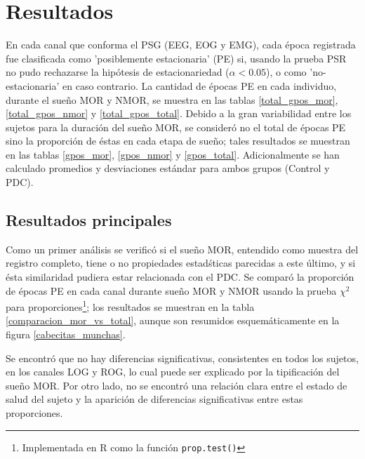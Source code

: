 \documentclass[12pt,a4paper]{mitthesis}
\begin{document}

\chapter{Resultados}

En cada canal que conforma el PSG (EEG, EOG y EMG), cada \'epoca registrada fue clasificada como 
'posiblemente estacionaria' (PE) si, usando la prueba PSR no pudo rechazarse la hip\'otesis de 
estacionariedad ($\alpha < 0.05$), o como 'no-estacionaria' en caso contrario.
La cantidad de \'epocas PE en cada individuo, durante el sue\~no MOR y NMOR, se muestra en las 
tablas \ref{total_gpos_mor}, \ref{total_gpos_nmor} y \ref{total_gpos_total}. Debido a la gran 
variabilidad entre los sujetos para la duraci\'on del sue\~no MOR, se consider\'o no el total de 
\'epocas PE sino la proporci\'on de \'estas en cada etapa de sue\~no; tales resultados se muestran 
en las tablas \ref{gpos_mor}, \ref{gpos_nmor} y \ref{gpos_total}. 
Adicionalmente se han calculado promedios y desviaciones est\'andar para ambos grupos (Control y 
PDC).

\section{Resultados principales}

Como un primer an\'alisis se verific\'o si el sue\~no MOR, entendido como muestra del registro
completo, tiene o no propiedades estad\'sticas parecidas a este \'ultimo, y si \'esta similaridad 
pudiera estar relacionada con el PDC. 
Se compar\'o la proporci\'on de \'epocas PE en cada canal durante sue\~no MOR y NMOR usando la 
prueba $\chi^{2}$ para proporciones\footnote{Implementada en R como la funci\'on 
\texttt{prop.test()}}; los resultados se muestran en la tabla \ref{comparacion_mor_vs_total},
aunque son resumidos esquem\'aticamente en la figura \ref{cabecitas_munchas}.

Se encontr\'o que no hay diferencias significativas, consistentes en todos los sujetos, en los 
canales LOG y ROG, lo cual puede ser explicado por la tipificaci\'on del sue\~no MOR. 
Por otro lado, no se encontr\'o una relaci\'on clara entre el estado de salud del sujeto y la 
aparici\'on de diferencias significativas entre estas proporciones.
\end{document}
